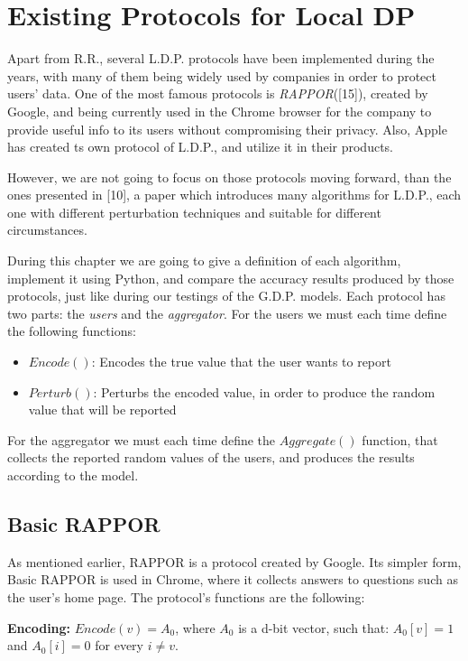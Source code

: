 

\section{Existing Protocols for Local DP}

Apart from R.R., several L.D.P. protocols have been implemented during the years, with many of them being widely used by companies in order to protect users' data. One of the most famous protocols is \emph{RAPPOR}([15]), created by Google, and being currently used in the Chrome browser for the company to provide useful info to its users without compromising their privacy. Also, Apple has created ts own protocol of L.D.P., and utilize it in their products. 

However, we are not going to focus on those protocols moving forward, than the ones presented in [10], a paper which introduces many algorithms for L.D.P., each one with different perturbation techniques and suitable for different circumstances.

During this chapter we are going to give a definition of each algorithm, implement it using Python, and compare the accuracy results produced by those protocols, just like during our testings of the G.D.P. models. Each protocol has two parts: the \emph{users} and the \emph{aggregator}. For the users we must each time define the following functions:

\begin{itemize}
    \item $Encode()$: Encodes the true value that the user wants to report
    \item $Perturb()$: Perturbs the encoded value, in order to produce the random value that will be reported
\end{itemize}

For the aggregator we must each time define the  $Aggregate()$ function, that collects the reported random values of the users, and produces the results according to the model.

\subsection{Basic RAPPOR}
As mentioned earlier, RAPPOR is a protocol created by Google. Its simpler form, Basic RAPPOR is used in Chrome, where it collects answers to questions such as the user's home page. The protocol's functions are the following:

\textbf{Encoding:} $Encode(v) = A_0$, where $A_0$ is a d-bit vector, such that: $A_0[v] = 1$ and $A_0[i] = 0$ for every $i \neq v$. 

